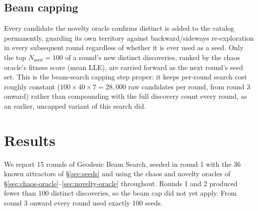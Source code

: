 \documentclass[11pt]{article}
\begin{document}
\subsection{Beam capping}
\label{sec:capping}

Every candidate the novelty oracle confirms distinct is added to the catalog
permanently, guarding its own territory against backward/sideways
re-exploration in every subsequent round regardless of whether it is ever
used as a seed. Only the top $N_{\mathrm{seed}} = 100$ of a round's new
distinct discoveries, ranked by the chaos oracle's fitness score (mean LLE),
are carried forward as the next round's seed set. This is the beam-search
capping step proper: it keeps per-round search cost roughly constant
($100 \times 40 \times 7 = 28{,}000$ raw candidates per round, from round 3
onward) rather than compounding with the full discovery count every round, as
an earlier, uncapped variant of this search did.

\section{Results}
\label{sec:results}

We report 15 rounds of Geodesic Beam Search, seeded in round 1 with the 36
known attractors of \S\ref{sec:seeds} and using the chaos and novelty oracles
of \S\ref{sec:chaos-oracle}--\ref{sec:novelty-oracle} throughout. Rounds 1
and 2 produced fewer than 100 distinct discoveries, so the beam cap did not
yet apply. From round 3 onward every round used exactly 100 seeds.
\end{document}
